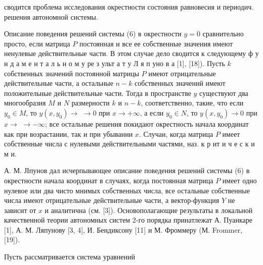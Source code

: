 \documentclass[10pt]{article}
\begin{document}
сводится проблема исследования окрестности состояния равновесия и периодич. решения автономной системы.



Описание поведения решений системы (6) в окрестности $y=0$ сравнительно просто, если матрица $P$ постоянная и все ее собственные значения имеют ненулевые действительные части. В этом случае дело сводится к следующему ф у н д а м е н т а л ь н о м у ре з ульт а т у Л я п уно в а [1], [18]). Пусть $k$ собственных значений постоянной матрицы $P$ имеют отрицательные действительные части, а остальные $n-k$ собственных значений имеют положительные действительные части. Тогда в пространстве $y$ существуют два многообразия $M$ и $N$ размерности $k$ и $n-k$, соответственно, такие, что если $y_{0} \in M$, то $y\left(x, y_{0}\right) \rightarrow$ $\rightarrow 0$ при $x \rightarrow+\infty$, а если $y_{0} \in N$, то $y\left(x, y_{0}\right) \rightarrow 0$ при $x \rightarrow$ $\rightarrow-\infty$; все остальные решения покидают окрестность начала координат как при возрастании, так и при убывании $x$. Случаи, когда матрица $P$ имеет собственные числа с нулевыми действительными частями, наз. к р ит и ч е с к и м и.



А. М. ЈІпунов дал исчерпывающее описание поведения решений системы (6) в окрестности начала координат в случаях, когда постоянная матрица $P$ имеет одно нулевое или два чисто мнимых собственных числа, все остальные собственные числа имеют отрицательные действительные части, а вектор-функция $Y$ не зависит от $x$ и аналитична (см. [3]). Основополагающие результаты в локальной качественной теории автономных систем 2-го порядка принатлежат А. Пуанкаре [1], А. М. Ляпунову [3, 4], И. Бендиксону [11] и М. Фроммеру (М. Frommer, [19]).



Пусть рассматривается система уравнений
\end{document}
